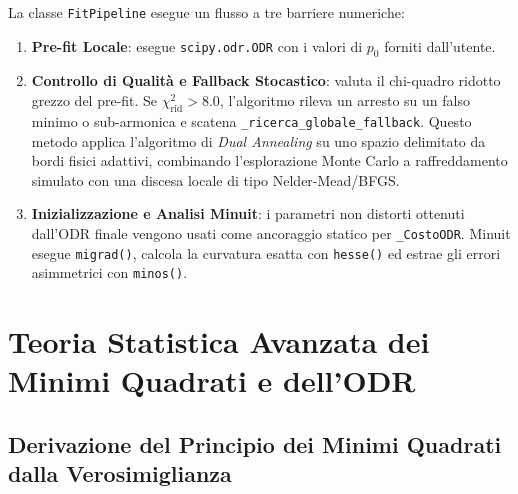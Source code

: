 \documentclass[11pt,a4paper]{article}
\begin{document}
La classe \texttt{FitPipeline} esegue un flusso a tre barriere numeriche:
\begin{enumerate}
    \item \textbf{Pre-fit Locale}: esegue \texttt{scipy.odr.ODR} con i valori di $p_0$ forniti dall'utente.
    \item \textbf{Controllo di Qualità e Fallback Stocastico}: valuta il chi-quadro ridotto grezzo del pre-fit. Se $\chi^2_{\text{rid}} > 8.0$, l'algoritmo rileva un arresto su un falso minimo o sub-armonica e scatena \texttt{\_ricerca\_globale\_fallback}. Questo metodo applica l'algoritmo di \emph{Dual Annealing} su uno spazio delimitato da bordi fisici adattivi, combinando l'esplorazione Monte Carlo a raffreddamento simulato con una discesa locale di tipo Nelder-Mead/BFGS.
    \item \textbf{Inizializzazione e Analisi Minuit}: i parametri non distorti ottenuti dall'ODR finale vengono usati come ancoraggio statico per \texttt{\_CostoODR}. Minuit esegue \texttt{migrad()}, calcola la curvatura esatta con \texttt{hesse()} ed estrae gli errori asimmetrici con \texttt{minos()}.
\end{enumerate}

\newpage

\section{Teoria Statistica Avanzata dei Minimi Quadrati e dell'ODR}

\subsection{Derivazione del Principio dei Minimi Quadrati dalla Verosimiglianza}
\end{document}
